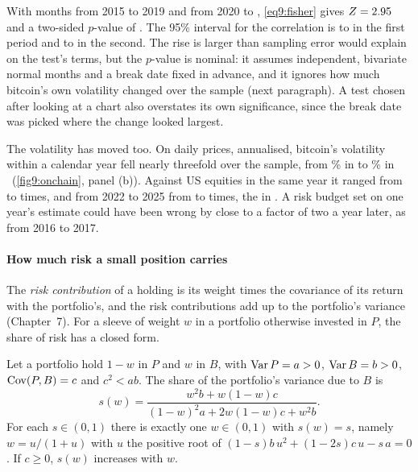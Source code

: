 \begin{chapterrefs}
With \ocNEarly{} months from 2015 to 2019 and \ocNLate{} from 2020 to \tfLast, \cref{eq9:fisher} gives $Z=2.95$
and a two-sided $p$-value of \ocFisherP. The 95\% interval for the correlation is \ocEarlyLo{} to \ocEarlyHi{}
in the first period and \ocLateLo{} to \ocLateHi{} in the second. The rise is larger than sampling error
would explain on the test's terms, but the $p$-value is nominal: it assumes independent, bivariate
normal months and a break date fixed in advance, and it ignores how much bitcoin's own volatility
changed over the sample (next paragraph). A test chosen after looking at a chart also overstates its own significance,
since the break date was picked where the change looked largest.

The volatility has moved too. On daily prices, annualised, bitcoin's volatility within a calendar year
fell nearly threefold over the sample, from \btVolFirstYear\% in \btVolFirstYearName{} to \btVolLastYear\% in
\btVolLastYearName{}~(\cref{fig9:onchain}, panel (b)). Against US equities in the same year it
ranged from \ocRatioMin{} to \ocRatioMax{} times, and from 2022 to 2025 from \ocRatioRecentMin{} to
\ocRatioRecentMax{} times, the \ocRatioRecentMax{} in \ocRatioRecentMaxYear. A risk budget set
on one year's estimate could have been wrong by close to a factor of two a year later, as from 2016
to 2017.


\paragraph{How much risk a small position carries}
The \emph{risk contribution} of a holding is its weight times the covariance of its return with the
portfolio's, and the risk contributions add up to the portfolio's variance (Chapter~7). For a sleeve of
weight $w$ in a portfolio otherwise invested in $P$, the share of risk has a closed form.

\begin{proposition}\label{prop9:share}
Let a portfolio hold $1-w$ in $P$ and $w$ in $B$, with $\operatorname{Var} P=a>0$, $\operatorname{Var} B=b>0$, $\operatorname{Cov}(P,B)=c$ and
$c^2<ab$. The share of the portfolio's variance due to $B$ is
\begin{equation}\label{eq9:share}
  s(w) = \frac{w^2b+w(1-w)c}{(1-w)^2a+2w(1-w)c+w^2b}.
\end{equation}
For each $s\in(0,1)$ there is exactly one $w\in(0,1)$ with $s(w)=s$, namely $w=u/(1+u)$ with $u$ the
positive root of $(1-s)b\,u^2+(1-2s)c\,u-s\,a=0$. If $c\ge0$, $s(w)$ increases with $w$.
\end{proposition}


\end{chapterrefs}
